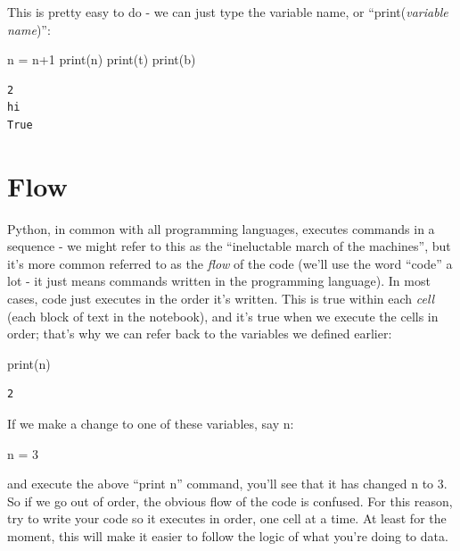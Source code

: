 \documentclass[
  letterpaper,
  DIV=11,
  numbers=noendperiod]{scrreprt}
\newenvironment{Shaded}{\begin{snugshade}}{\end{snugshade}}
\newcommand{\BuiltInTok}[1]{\textcolor[rgb]{0.00,0.23,0.31}{#1}}
\newcommand{\DecValTok}[1]{\textcolor[rgb]{0.68,0.00,0.00}{#1}}
\newcommand{\NormalTok}[1]{\textcolor[rgb]{0.00,0.23,0.31}{#1}}
\newcommand{\OperatorTok}[1]{\textcolor[rgb]{0.37,0.37,0.37}{#1}}
\begin{document}
This is pretty easy to do - we can just type the variable name, or
``print(\emph{variable name})'':

\begin{Shaded}
\begin{Highlighting}[]
\NormalTok{n }\OperatorTok{=}\NormalTok{ n}\OperatorTok{+}\DecValTok{1}
\BuiltInTok{print}\NormalTok{(n)}
\BuiltInTok{print}\NormalTok{(t)}
\BuiltInTok{print}\NormalTok{(b)}
\end{Highlighting}
\end{Shaded}

\begin{verbatim}
2
hi
True
\end{verbatim}

\hypertarget{flow}{%
\section{Flow}\label{flow}}

Python, in common with all programming languages, executes commands in a
sequence - we might refer to this as the ``ineluctable march of the
machines'', but it's more common referred to as the \emph{flow} of the
code (we'll use the word ``code'' a lot - it just means commands written
in the programming language). In most cases, code just executes in the
order it's written. This is true within each \emph{cell} (each block of
text in the notebook), and it's true when we execute the cells in order;
that's why we can refer back to the variables we defined earlier:

\begin{Shaded}
\begin{Highlighting}[]
\BuiltInTok{print}\NormalTok{(n)}
\end{Highlighting}
\end{Shaded}

\begin{verbatim}
2
\end{verbatim}

If we make a change to one of these variables, say n:

\begin{Shaded}
\begin{Highlighting}[]
\NormalTok{n }\OperatorTok{=} \DecValTok{3}
\end{Highlighting}
\end{Shaded}

and execute the above ``print n'' command, you'll see that it has
changed n to 3. So if we go out of order, the obvious flow of the code
is confused. For this reason, try to write your code so it executes in
order, one cell at a time. At least for the moment, this will make it
easier to follow the logic of what you're doing to data.
\end{document}
